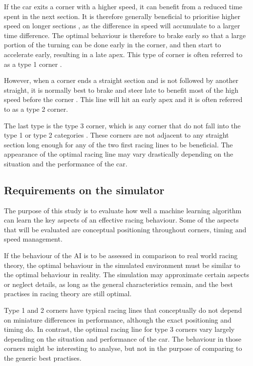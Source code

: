 If the car exits a corner with a higher speed, it can benefit from a reduced time spent in the next section. It is therefore generally beneficial to prioritise higher speed on longer sections \cite{beckman, edmondson}, as the difference in speed will accumulate to a larger time difference. The optimal behaviour is therefore to brake early so that a large portion of the turning can be done early in the corner, and then start to accelerate early, resulting in a late apex. This type of corner is often referred to as a type 1 corner \cite{edmondson}.

However, when a corner ends a straight section and is not followed by another straight, it is normally best to brake and steer late to benefit most of the high speed before the corner \cite{edmondson}. This line will hit an early apex and it is often referred to as a type 2 corner.

The last type is the type 3 corner, which is any corner that do not fall into the type 1 or type 2 categories \cite{edmondson}. These corners are not adjacent to any straight section long enough for any of the two first racing lines to be beneficial. The appearance of the optimal racing line may vary drastically depending on the situation and the performance of the car.

\subsection{Requirements on the simulator}
\label{requirements}
The purpose of this study is to evaluate how well a machine learning algorithm can learn the key aspects of an effective racing behaviour. Some of the aspects that will be evaluated are conceptual positioning throughout corners, timing and speed management.

If the behaviour of the AI is to be assessed in comparison to real world racing theory, the optimal behaviour in the simulated environment must be similar to the optimal behaviour in reality. The simulation may approximate certain aspects or neglect details, as long as the general characteristics remain, and the best practises in racing theory are still optimal. 

Type 1 and 2 corners have typical racing lines that conceptually do not depend on miniature differences in performance, although the exact positioning and timing do. In contrast, the optimal racing line for type 3 corners vary largely depending on the situation and performance of the car. The behaviour in those corners might be interesting to analyse, but not in the purpose of comparing to the generic best practises.

